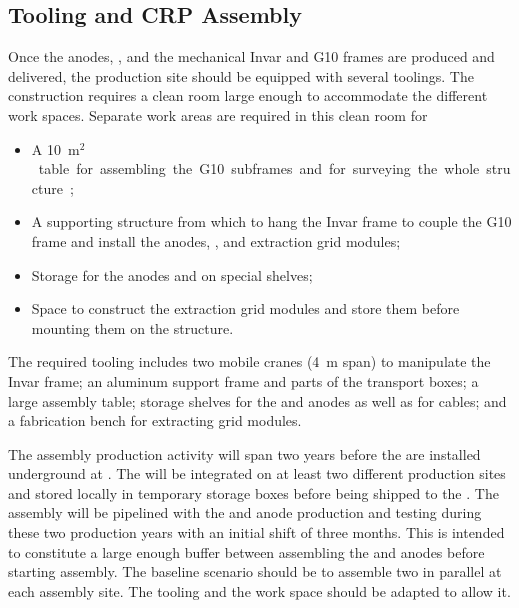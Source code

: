 \subsection{Tooling and CRP Assembly}
\label{sec:dp-crp-tooling-assy}
Once the anodes, , and the mechanical Invar and G10 frames are produced and delivered, the  production site should be equipped with several toolings.
The  construction requires a clean room large enough to accommodate the different work spaces. Separate work areas are required in this clean room for 
\begin{itemize}
\item{A \SI{10}{m$^2$} table for assembling the G10 subframes and for surveying the whole structure;}
\item{A supporting structure from which to hang the Invar frame to couple the G10 frame and install the anodes, , and extraction grid modules;}
\item{Storage for the anodes and  on special shelves;}
\item{Space to construct the extraction grid modules and store them before mounting them on the  structure.}
\end{itemize}
The required tooling includes two mobile cranes (\SI{4}{m} span) to manipulate the Invar frame; an aluminum support frame and parts of the transport boxes; a large assembly table; storage shelves for the  and anodes as well as for cables; and a fabrication bench for extracting grid modules.

The  assembly production activity will span two years 
before the  are installed underground at . The  will be integrated on at least two different production sites and stored locally in temporary storage boxes before being shipped to the . 
The  assembly will be pipelined with the  and anode production and testing during these two production years with an initial  shift of three months. This is intended to constitute a large enough buffer between assembling the  and anodes before starting  assembly. The baseline scenario should be to assemble two  in parallel at each assembly site. The tooling and the work space should be adapted to allow it.


